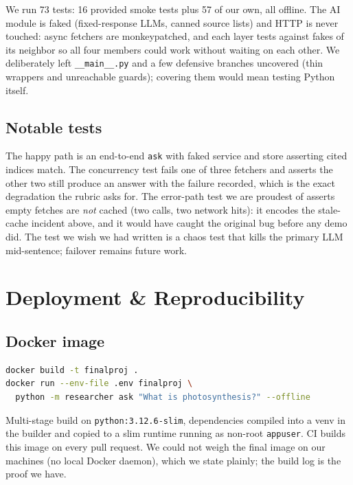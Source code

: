 \documentclass[11pt,a4paper]{article}
\begin{document}
We run 73 tests: 16 provided smoke tests plus 57 of our own, all offline. The AI module is faked (fixed-response LLMs, canned source lists) and HTTP is never touched: async fetchers are monkeypatched, and each layer tests against fakes of its neighbor so all four members could work without waiting on each other. We deliberately left \texttt{\_\_main\_\_.py} and a few defensive branches uncovered (thin wrappers and unreachable guards); covering them would mean testing Python itself.

\subsection{Notable tests}

The happy path is an end-to-end \texttt{ask} with faked service and store asserting cited indices match. The concurrency test fails one of three fetchers and asserts the other two still produce an answer with the failure recorded, which is the exact degradation the rubric asks for. The error-path test we are proudest of asserts empty fetches are \emph{not} cached (two calls, two network hits): it encodes the stale-cache incident above, and it would have caught the original bug before any demo did. The test we wish we had written is a chaos test that kills the primary LLM mid-sentence; failover remains future work.

\section{Deployment \& Reproducibility}\label{sec:deploy}

\subsection{Docker image}

\begin{lstlisting}[style=python,language=bash,numbers=none]
docker build -t finalproj .
docker run --env-file .env finalproj \
  python -m researcher ask "What is photosynthesis?" --offline
\end{lstlisting}

Multi-stage build on \texttt{python:3.12.6-slim}, dependencies compiled into a venv in the builder and copied to a slim runtime running as non-root \texttt{appuser}. CI builds this image on every pull request. We could not weigh the final image on our machines (no local Docker daemon), which we state plainly; the build log is the proof we have.
\end{document}
